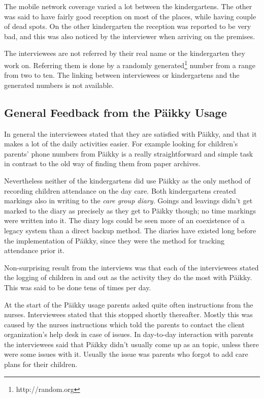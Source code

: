 The mobile network coverage varied a lot between the kindergartens. The other was said to  have fairly good reception on most of the places, while having couple of dead spots. On the other kindergarten the reception was reported to be very bad, and this was also noticed by the interviewer when arriving on the premises. 

The interviewees are not referred by their real name or the kindergarten they work on. Referring them is done by a randomly generated\footnote{http://random.org} number from a range from two to ten. The linking between interviewees or kindergartens and the generated numbers is not available.



\subsection{General Feedback from the Päikky Usage}

In general the interviewees stated that they are satisfied with Päikky, and that it makes a lot of the daily activities easier. For example looking for children's parents' phone numbers from Päikky is a really straightforward and simple task in contrast to the old way of finding them from paper archives. 

Nevertheless neither of the kindergartens did use Päikky as the only method of recording children attendance on the day care. Both kindergartens created markings also in writing to the \textit{care group diary}. Goings and leavings didn't get marked to the diary as precisely as they get to Päikky though; no time markings were written into it. The diary logs could be seen more of an coexistence of a legacy system than a direct backup method. The diaries have existed long before the implementation of Päikky, since they were the method for tracking attendance prior it. 

Non-surprising result from the interviews was that each of the interviewees stated the logging of children in and out as the activity they do the most with Päikky. This was said to be done tens of times per day.

At the start of the Päikky usage parents asked quite often instructions from the nurses. Interviewees stated that this stopped shortly thereafter. Mostly this was caused by the nurses instructions which told the parents to contact the client organization's help desk in case of issues. In day-to-day interaction with parents the interviewees said that Päikky didn't usually come up as an topic, unless there were some issues with it. Usually the issue was parents who forgot to add care plans for their children.

